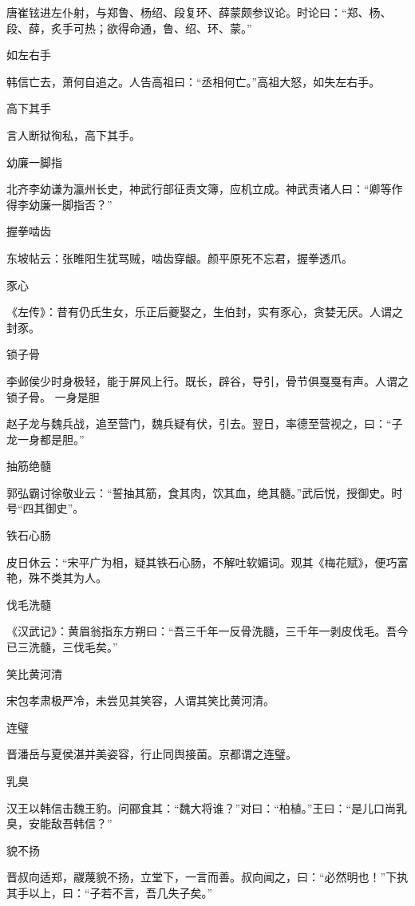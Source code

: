 \documentclass[a4paper,12pt,UTF8,twoside]{ctexbook}
\begin{document}
    唐崔铉进左仆射，与郑鲁、杨绍、段复环、薛蒙颇参议论。时论曰：“郑、杨、段、薛，炙手可热；欲得命通，鲁、绍、环、蒙。”
    
    如左右手
    
    韩信亡去，萧何自追之。人告高祖曰：“丞相何亡。”高祖大怒，如失左右手。
    
    高下其手
    
    言人断狱徇私，高下其手。
    
    幼廉一脚指
    
    北齐李幼谦为瀛州长史，神武行部征责文簿，应机立成。神武责诸人曰：“卿等作得李幼廉一脚指否？”
    
    握拳啮齿
    
    东坡帖云：张睢阳生犹骂贼，啮齿穿龈。颜平原死不忘君，握拳透爪。
    
    豕心
    
    《左传》：昔有仍氏生女，乐正后夔娶之，生伯封，实有豕心，贪婪无厌。人谓之封豕。
    
    锁子骨
    
    李邺侯少时身极轻，能于屏风上行。既长，辟谷，导引，骨节俱戛戛有声。人谓之锁子骨。
    一身是胆
    
    赵子龙与魏兵战，追至营门，魏兵疑有伏，引去。翌日，率德至营视之，曰：“子龙一身都是胆。”
    
    抽筋绝髓
    
    郭弘霸讨徐敬业云：“誓抽其筋，食其肉，饮其血，绝其髓。”武后悦，授御史。时号“四其御史”。
    
    铁石心肠
    
    皮日休云：“宋平广为相，疑其铁石心肠，不解吐软媚词。观其《梅花赋》，便巧富艳，殊不类其为人。
    
    伐毛洗髓
    
    《汉武记》：黄眉翁指东方朔曰：“吾三千年一反骨洗髓，三千年一剥皮伐毛。吾今已三洗髓，三伐毛矣。”
    
    笑比黄河清
    
    宋包孝肃极严冷，未尝见其笑容，人谓其笑比黄河清。
    
    连璧
    
    晋潘岳与夏侯湛并美姿容，行止同舆接菌。京都谓之连璧。
    
    乳臭
    
    汉王以韩信击魏王豹。问郦食其：“魏大将谁？”对曰：“柏植。”王曰：“是儿口尚乳臭，安能敌吾韩信？”
    
    貌不扬
    
    晋叔向适郑，鬷蔑貌不扬，立堂下，一言而善。叔向闻之，曰：“必然明也！”下执其手以上，曰：“子若不言，吾几失子矣。”
    
\end{document}

